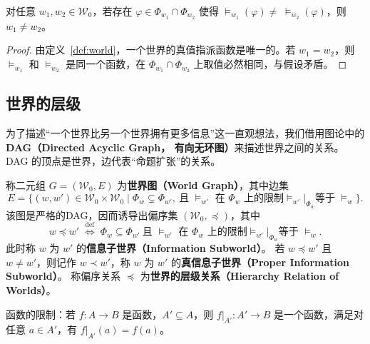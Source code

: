 \begin{theorem}\label{thm:distinct}
    对任意 $w_1,w_2\in\mathcal{W}_0$，若存在 $\varphi\in\Phi_{w_1}\cap\Phi_{w_2}$ 使得
    $\models_{w_1}(\varphi)\neq\;\models_{w_2}(\varphi)$，则 $w_1\neq w_2$。
\end{theorem}
\begin{proof}
    由定义~\ref{def:world}，一个世界的真值指派函数是唯一的。若 $w_1 = w_2$，则 $\models_{w_1}$ 和 $\models_{w_2}$ 是同一个函数，在 $\Phi_{w_1}\cap\Phi_{w_2}$ 上取值必然相同，与假设矛盾。
\end{proof}

\subsection{世界的层级}\label{subsec:levelofworld}
为了描述“一个世界比另一个世界拥有更多信息”这一直观想法，我们借用图论中的 \textbf{DAG（Directed Acyclic Graph， 有向无环图）}来描述世界之间的关系。DAG 的顶点是世界，边代表“命题扩张”的关系。

\begin{definition}[世界图与世界的层级关系]\label{def:graph}
    称二元组 $G=(\mathcal{W}_0,E)$ 为\textbf{世界图（World Graph）}，其中边集
    \begin{equation}
        E=\{(w,w')\in\mathcal{W}_0\times\mathcal{W}_0\mid \Phi_w \subsetneq \Phi_{w'},\ \text{且 } \models_{w'} \text{ 在 } \Phi_w \text{ 上的限制}\models_{w'}|_{\Phi_w}\text{等于 } \models_w\}.
    \end{equation}
    该图是严格的DAG，因而诱导出偏序集 $(\mathcal{W}_0,\preceq)$，其中
    \begin{equation}
        w\preceq w'\;\stackrel{\text{def}}{\Longleftrightarrow}\;
        \Phi_w \subseteq \Phi_{w'}\ \text{且 } \models_{w'} \text{ 在 } \Phi_w \text{ 上的限制}\models_{w'}|_{\Phi_w}\text{等于 } \models_w.
    \end{equation}
    此时称 $w$ 为 $w'$ 的\textbf{信息子世界（Information Subworld）}。
    若 $w \preceq w'$ 且 $w \neq w'$，则记作 $w \prec w'$，称 $w$ 为 $w'$ 的\textbf{真信息子世界（Proper Information Subworld）}。
    称偏序关系 $\preceq$ 为\textbf{世界的层级关系（Hierarchy Relation of Worlds）}。
\end{definition}

\begin{remark}
    函数的限制：若 $f:A\to B$ 是函数，$A'\subseteq A$，则 $f|_{A'}:A'\to B$ 是一个函数，满足对任意 $a\in A'$，有 $f|_{A'}(a)=f(a)$。
\end{remark}

